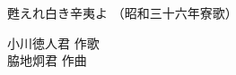 \documentclass[10pt,b5j]{tarticle} %
\begin{document}
\begin{minipage}[c]{0.7\hsize} %
    \begin{center}
        {\LARGE
            甦えれ白き辛夷よ %
        }
        {\small 
            （昭和三十六年寮歌） %
        }
    \end{center}
\end{minipage}
\begin{minipage}[c]{0.3\hsize} %
    \begin{flushright} %
        小川徳人君 作歌\\脇地炯君 作曲 %
    \end{flushright}
\end{minipage}
\end{document}
